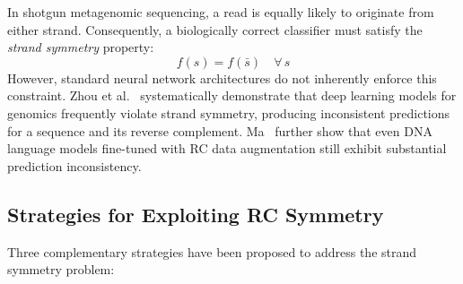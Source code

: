 In shotgun metagenomic sequencing, a read is equally likely to originate from either strand. Consequently, a biologically correct classifier must satisfy the \emph{strand symmetry} property:
\begin{equation}
    f(s) = f(\bar{s}) \quad \forall\, s
    \label{eq:strand-symmetry}
\end{equation}
However, standard neural network architectures do not inherently enforce this constraint. Zhou et al.~\cite{Zhou2022rc} systematically demonstrate that deep learning models for genomics frequently violate strand symmetry, producing inconsistent predictions for a sequence and its reverse complement. Ma~\cite{Ma2025rc} further show that even DNA language models fine-tuned with RC data augmentation still exhibit substantial prediction inconsistency.

\subsection{Strategies for Exploiting RC Symmetry}

Three complementary strategies have been proposed to address the strand symmetry problem:

